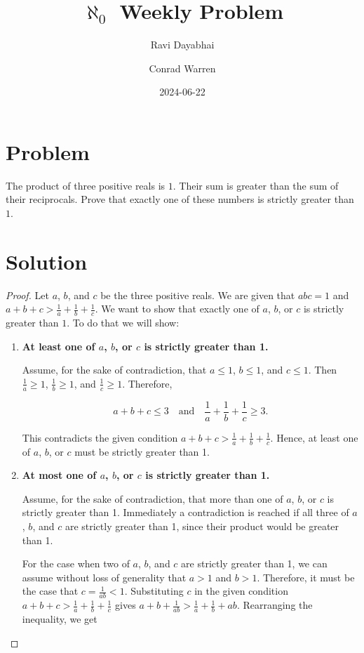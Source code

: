 \documentclass{article}
\title{$\aleph_{0}$ Weekly Problem}
\author{Ravi Dayabhai \and Conrad Warren}
\date{2024-06-22}
\begin{document}
\maketitle

\section*{Problem}

The product of three positive reals is $1$. Their sum is greater than the sum of their reciprocals. Prove that exactly one of these numbers is strictly greater than $1$.

\section*{Solution}

\begin{proof}
  Let $a$, $b$, and $c$ be the three positive reals. We are given that $abc = 1$ and $a + b + c > \frac{1}{a} + \frac{1}{b} + \frac{1}{c}$. 
  We want to show that exactly one of $a$, $b$, or $c$ is strictly greater than $1$. To do that we will show:

\begin{enumerate}
    \item \textbf{At least one of $a$, $b$, or $c$ is strictly greater than 1.}
    
    Assume, for the sake of contradiction, that $a \leq 1$, $b \leq 1$, and $c \leq 1$. Then $\frac{1}{a} \geq 1$, $\frac{1}{b} \geq 1$, and $\frac{1}{c} \geq 1$. Therefore,

    \[
      a + b + c \leq 3 \quad \text{and} \quad \frac{1}{a} + \frac{1}{b} + \frac{1}{c} \geq 3.
    \]

    This contradicts the given condition $a + b + c > \frac{1}{a} + \frac{1}{b} + \frac{1}{c}$. Hence, at least one of $a$, $b$, or $c$ must be strictly greater than 1.
    
    \item \textbf{At most one of $a$, $b$, or $c$ is strictly greater than 1.}
    
    Assume, for the sake of contradiction, that more than one of $a$, $b$, or $c$ is strictly greater than 1. Immediately a contradiction is reached if all three of $a$, $b$, and $c$ are strictly greater than 1, since their product would be greater than 1.

    For the case when two of $a$, $b$, and $c$ are strictly greater than 1, we can assume without loss of generality that $a > 1$ and $b > 1$. Therefore, it must be the case that $c = \frac{1}{ab} < 1$. Substituting $c$ in the given condition $a + b + c > \frac{1}{a} + \frac{1}{b} + \frac{1}{c}$ gives $a + b + \frac{1}{ab} > \frac{1}{a} + \frac{1}{b} + ab$. Rearranging the inequality, we get


\end{enumerate}
\end{proof}
\end{document}
